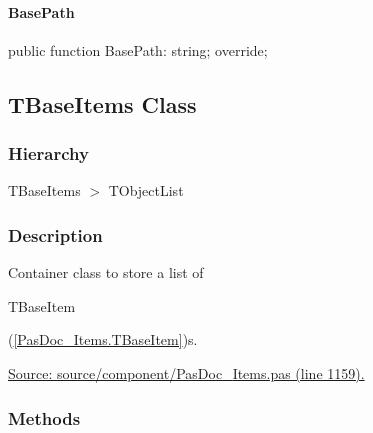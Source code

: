 \documentclass{report}
\newif\ifpdf
\begin{document}
\paragraph*{BasePath}\hspace*{\fill}

\label{PasDoc_Items.TPasUnit-BasePath}
\begin{list}{}{
\setlength{\itemindent}{0cm}
\setlength{\listparindent}{0cm}
\setlength{\leftmargin}{\evensidemargin}
\addtolength{\leftmargin}{\tmplength}
\settowidth{\labelsep}{X}
\addtolength{\leftmargin}{\labelsep}
\setlength{\labelwidth}{\tmplength}
}
\item[\textbf{Declaration}\hfill]
\ifpdf
\begin{flushleft}
\fi
\begin{ttfamily}
public function BasePath: string; override;\end{ttfamily}

\ifpdf
\end{flushleft}
\fi

\end{list}
\ifpdf
\subsection*{\large{\textbf{TBaseItems Class}}\normalsize\hspace{1ex}\hrulefill}
\else
\subsection*{TBaseItems Class}
\fi
\label{PasDoc_Items.TBaseItems}
\subsubsection*{\large{\textbf{Hierarchy}}\normalsize\hspace{1ex}\hfill}
TBaseItems {$>$} TObjectList
\subsubsection*{\large{\textbf{Description}}\normalsize\hspace{1ex}\hfill}
Container class to store a list of \begin{ttfamily}TBaseItem\end{ttfamily}(\ref{PasDoc_Items.TBaseItem})s.\par
\href{https://github.com/pasdoc/pasdoc/blob/master/source/component/PasDoc_Items.pas#L1159}{Source: source/component/PasDoc{\_}Items.pas (line 1159).}\subsubsection*{\large{\textbf{Methods}}\normalsize\hspace{1ex}\hfill}
\end{document}
